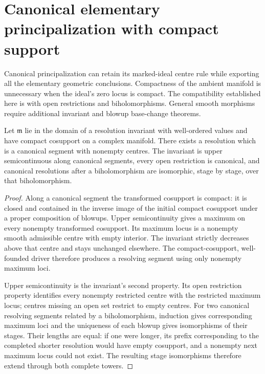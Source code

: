 \section{Canonical elementary principalization with compact support}

Canonical principalization can retain its marked-ideal centre rule while
exporting all the elementary geometric conclusions. Compactness of the
ambient manifold is unnecessary when the ideal's zero locus is compact.
The compatibility established here is with open restrictions and
biholomorphisms. General smooth morphisms require additional invariant
and blowup base-change theorems.

\begin{theorem}
\label{hir:canonical-resolution-compact-cosupport}
Let $\mathfrak m$ lie in the domain of a resolution invariant with
well-ordered values and have compact cosupport on a complex manifold.
There exists a resolution which is a canonical segment with nonempty
centres. The invariant is upper semicontinuous along canonical segments,
every open restriction is canonical, and canonical resolutions after a
biholomorphism are isomorphic, stage by stage, over that biholomorphism.
\leanok
\end{theorem}
\begin{proof}
Along a canonical segment the transformed cosupport is compact: it is
closed and contained in the inverse image of the initial compact cosupport
under a proper composition of blowups. Upper semicontinuity gives a
maximum on every nonempty transformed cosupport. Its maximum locus is
a nonempty smooth admissible centre with empty interior. The invariant
strictly decreases above that centre and stays unchanged elsewhere.
The compact-cosupport, well-founded driver therefore produces a
resolving segment using only nonempty maximum loci.

Upper semicontinuity is the invariant's second property. Its open
restriction property identifies every nonempty restricted centre with
the restricted maximum locus; centres missing an open set restrict to
empty centres. For two canonical resolving segments related by a
biholomorphism, induction gives corresponding maximum loci and the
uniqueness of each blowup gives isomorphisms of their stages. Their
lengths are equal: if one were longer, its prefix corresponding to the
completed shorter resolution would have empty cosupport, and a nonempty
next maximum locus could not exist. The resulting stage isomorphisms
therefore extend through both complete towers.
\end{proof}

